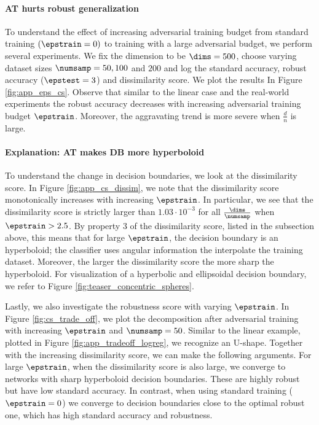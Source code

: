 \paragraph{AT hurts robust generalization}


To understand the effect of increasing adversarial training budget from standard training $(\epstrain = 0)$ to training with a large adversarial budget, we perform several experiments. We fix the dimension to be $\dims=500$, choose varying dataset sizes $\numsamp = 50, 100$ and $200$ and log the standard accuracy, robust accuracy ($\epstest = 3$) and dissimilarity score. We plot the results In Figure \ref{fig:app_eps_cs}. Observe that similar to the linear case and the real-world experiments the robust accuracy decreases with increasing adversarial training budget $\epstrain$. Moreover, the aggravating trend is more severe when $\frac{d}{n}$ is large. 

\paragraph{Explanation: AT makes DB more hyperboloid}
To understand the change in decision boundaries, we look at the dissimilarity score. In Figure \ref{fig:app_cs_dissim}, we note that the dissimilarity score monotonically increases with increasing $\epstrain$. In particular, we see that the dissimilarity score is strictly larger than $1.03 \cdot 10^{-3}$ for all $\frac{\dims}{\numsamp}$ when $\epstrain > 2.5$. By property 3 of the dissimilarity score, listed in the subsection above, this means that for large $\epstrain$, the decision boundary is an hyperboloid; the classifier uses angular information the interpolate the training dataset. Moreover, the larger the dissimilarity score the more sharp the hyperboloid. For visualization of a hyperbolic and ellipsoidal decision boundary, we refer to Figure \ref{fig:teaser_concentric_spheres}.

Lastly, we also investigate the robustness score with varying $\epstrain$. In Figure \ref{fig:cs_trade_off}, we plot the decomposition after adversarial training with increasing $\epstrain$ and $\numsamp = 50$. Similar to the linear example, plotted in Figure \ref{fig:app_tradeoff_logreg}, we recognize an U-shape. Together with the increasing dissimilarity score, we can make the following arguments. For large $\epstrain$, when the dissimilarity score is also large, we converge to networks with sharp hyperboloid decision boundaries. These are highly robust but have low standard accuracy. In contrast, when using standard training ($\epstrain = 0$) we converge to decision boundaries close to the optimal robust one, which has high standard accuracy and robustness. 

